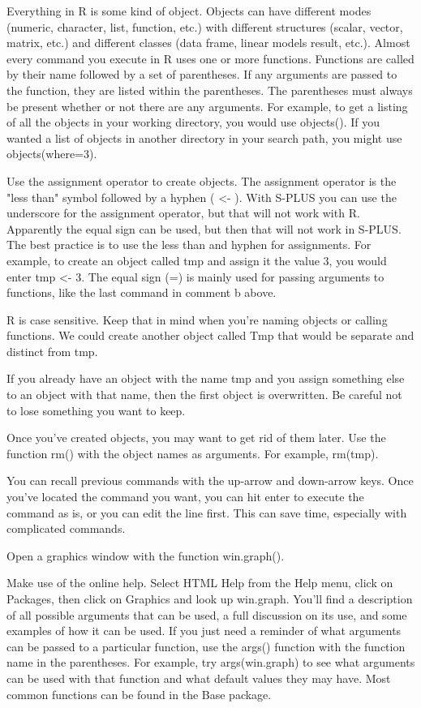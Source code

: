 \documentclass[a4paper,12pt]{article}
\begin{document}
Everything in R is some kind of object. Objects can have different modes (numeric, character, list, function, etc.) with different structures (scalar, vector, matrix, etc.) and different classes (data frame, linear models result, etc.). 
Almost every command you execute in R uses one or more functions. Functions are called by their name followed by a set of parentheses. If any arguments are passed to the function, they are listed within the parentheses. The parentheses must always be present whether or not there are any arguments. For example, to get a listing of all the objects in your working directory, you would use objects(). If you wanted a list of objects in another directory in your search path, you might use objects(where=3). 

Use the assignment operator to create objects. The assignment operator is the "less than" symbol followed by a hyphen ( <- ). With S-PLUS you can use the underscore for the assignment operator, but that will not work with R. Apparently the equal sign can be used, but then that will not work in S-PLUS. The best practice is to use the less than and hyphen for assignments. For example, to create an object called tmp and assign it the value 3, you would enter tmp <- 3. The equal sign (=) is mainly used for passing arguments to functions, like the last command in comment b above. 

R is case sensitive. Keep that in mind when you're naming objects or calling functions. We could create another object called Tmp that would be separate and distinct from tmp. 

If you already have an object with the name tmp and you assign something else to an object with that name, then the first object is overwritten. Be careful not to lose something you want to keep. 

Once you've created objects, you may want to get rid of them later. Use the function rm() with the object names as arguments. For example, rm(tmp). 

You can recall previous commands with the up-arrow and down-arrow keys. Once you've located the command you want, you can hit enter to execute the command as is, or you can edit the line first. This can save time, especially with complicated commands. 

Open a graphics window with the function win.graph(). 

Make use of the online help. Select HTML Help from the Help menu, click on Packages, then click on Graphics and look up win.graph. You'll find a description of all possible arguments that can be used, a full discussion on its use, and some examples of how it can be used. If you just need a reminder of what arguments can be passed to a particular function, use the args() function with the function name in the parentheses. For example, try args(win.graph) to see what arguments can be used with that function and what default values they may have. Most common functions can be found in the Base package. 
\end{document}
